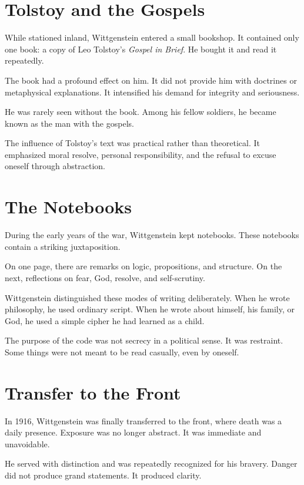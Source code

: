 \documentclass[11pt]{article}
\begin{document}
\section*{Tolstoy and the Gospels}

While stationed inland, Wittgenstein entered a small bookshop. It contained only one book: a copy of Leo Tolstoy’s \emph{Gospel in Brief}. He bought it and read it repeatedly.

The book had a profound effect on him. It did not provide him with doctrines or metaphysical explanations. It intensified his demand for integrity and seriousness.

He was rarely seen without the book. Among his fellow soldiers, he became known as the man with the gospels.

The influence of Tolstoy’s text was practical rather than theoretical. It emphasized moral resolve, personal responsibility, and the refusal to excuse oneself through abstraction.

\section*{The Notebooks}

During the early years of the war, Wittgenstein kept notebooks. These notebooks contain a striking juxtaposition.

On one page, there are remarks on logic, propositions, and structure. On the next, reflections on fear, God, resolve, and self-scrutiny.

Wittgenstein distinguished these modes of writing deliberately. When he wrote philosophy, he used ordinary script. When he wrote about himself, his family, or God, he used a simple cipher he had learned as a child.

The purpose of the code was not secrecy in a political sense. It was restraint. Some things were not meant to be read casually, even by oneself.

\section*{Transfer to the Front}

In 1916, Wittgenstein was finally transferred to the front, where death was a daily presence. Exposure was no longer abstract. It was immediate and unavoidable.

He served with distinction and was repeatedly recognized for his bravery. Danger did not produce grand statements. It produced clarity.
\end{document}
